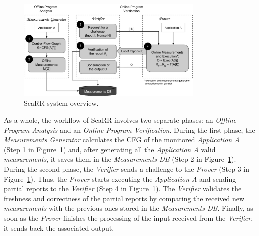 \begin{figure}[h]
	\centering
	\includegraphics[width=0.8\textwidth]{fig_c4/overview.pdf}
	\caption{ScaRR system overview.}
	\label{fig:overview}
\end{figure}

As a whole, the workflow of ScaRR involves two separate phases: an 
\emph{Offline Program Analysis} and an \emph{Online Program Verification}. 
During the first phase, the \emph{Measurements Generator} calculates the CFG of 
the monitored \emph{Application A} (Step 1 in Figure~\ref{fig:overview}) and, 
after generating all the \emph{Application A} valid \emph{measurements}, it 
saves them in the \emph{Measurements DB} (Step 2 in Figure~\ref{fig:overview}).
During the second phase, the \emph{Verifier} sends a challenge to the 
\emph{Prover} (Step 3 in Figure~\ref{fig:overview}).
Thus, the \emph{Prover} starts executing the  \emph{Application A} and sending 
partial reports to the \emph{Verifier} (Step 4 in Figure~\ref{fig:overview}). 
The \emph{Verifier} validates the freshness and correctness of the partial 
reports by comparing the received new \emph{measurements} with the previous 
ones stored in the \emph{Measurements DB}. Finally, as soon as the 
\emph{Prover} finishes the processing of the input received from the 
\emph{Verifier}, it sends back the associated output. 



